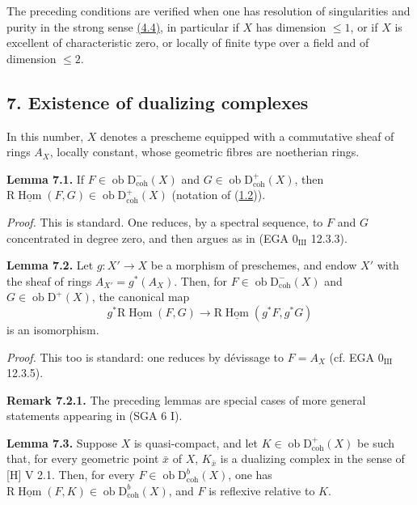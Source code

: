 \documentclass[11pt]{article}
\DeclareMathOperator{\Hom}{Hom}
\newcommand{\R}{\mathrm{R}}
\newcommand{\D}{\mathrm{D}}
\newcommand{\ob}{\operatorname{ob}}
\providecommand{\Hom}{\operatorname{Hom}}
\providecommand{\ob}{\operatorname{ob}}
\providecommand{\R}{\mathrm R}
\providecommand{\Hom}{\operatorname{Hom}}
\begin{document}
The preceding conditions are verified when one has resolution of singularities and purity in the strong sense \hyperref[sga5:I:definition:4.4]{(4.4)}, in particular if $X$ has dimension $\leq1$, or if $X$ is excellent of characteristic zero, or locally of finite type over a field and of dimension $\leq2$.

\subsection*{7. Existence of dualizing complexes}\label{sga5:I:subsection:7}

In this number, $X$ denotes a prescheme equipped with a commutative sheaf of rings $A_X$, locally constant, whose geometric fibres are noetherian rings.

\label{sga5:I:lemma:7.1}\textbf{Lemma 7.1.} If $F\in\ob\D^{-}_{\mathrm{coh}}(X)$ and $G\in\ob\D^{+}_{\mathrm{coh}}(X)$, then $\R\underline{\Hom}(F,G)\in\ob\D^{+}_{\mathrm{coh}}(X)$ (notation of (\hyperref[sga5:I:paragraph:1.2]{1.2})).

\emph{Proof.} This is standard. One reduces, by a spectral sequence, to $F$ and $G$ concentrated in degree zero, and then argues as in (EGA $0_{\mathrm{III}}$ 12.3.3).

\label{sga5:I:lemma:7.2}\textbf{Lemma 7.2.} Let $g:X'\to X$ be a morphism of preschemes, and endow $X'$ with the sheaf of rings $A_{X'}=g^*(A_X)$. Then, for $F\in\ob\D^{-}_{\mathrm{coh}}(X)$ and $G\in\ob\D^{+}(X)$, the canonical map
\[
        g^*\R\underline{\Hom}(F,G)\longrightarrow \R\underline{\Hom}(g^*F,g^*G)
\]
is an isomorphism.

\emph{Proof.} This too is standard: one reduces by dévissage to $F=A_X$ (cf. EGA $0_{\mathrm{III}}$ 12.3.5).

\label{sga5:I:remark:7.2.1}\textbf{Remark 7.2.1.} The preceding lemmas are special cases of more general statements appearing in (SGA 6 I).

\label{sga5:I:lemma:7.3}\textbf{Lemma 7.3.} Suppose $X$ is quasi-compact, and let $K\in\ob\D^{+}_{\mathrm{coh}}(X)$ be such that, for every geometric point $\bar{x}$ of $X$, $K_{\bar{x}}$ is a dualizing complex in the sense of [H] V 2.1. Then, for every $F\in\ob\D^{b}_{\mathrm{coh}}(X)$, one has $\R\underline{\Hom}(F,K)\in\ob\D^{b}_{\mathrm{coh}}(X)$, and $F$ is reflexive relative to $K$.
\end{document}
